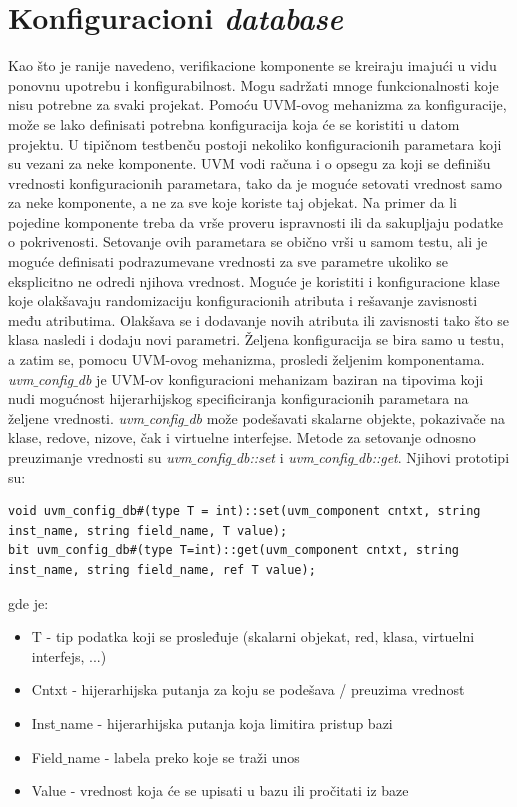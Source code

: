 \section{Konfiguracioni \emph{database}}

Kao što je ranije navedeno, verifikacione komponente se kreiraju imajući u vidu
ponovnu upotrebu i konfigurabilnost. Mogu sadržati mnoge funkcionalnosti koje
nisu potrebne za svaki projekat. Pomoću UVM-ovog mehanizma za konfiguracije,
može se lako definisati potrebna konfiguracija koja će se koristiti u datom
projektu. U tipičnom testbenču postoji nekoliko konfiguracionih parametara koji
su vezani za neke komponente. UVM vodi računa i o opsegu za koji se definišu
vrednosti konfiguracionih parametara, tako da je moguće setovati vrednost samo
za neke komponente, a ne za sve koje koriste taj objekat. Na primer da li
pojedine komponente treba da vrše proveru ispravnosti ili da sakupljaju podatke
o pokrivenosti. Setovanje ovih parametara se obično vrši u samom testu, ali je
moguće definisati podrazumevane vrednosti za sve parametre ukoliko se
eksplicitno ne odredi njihova vrednost. Moguće je koristiti i konfiguracione
klase koje olakšavaju randomizaciju konfiguracionih atributa i rešavanje
zavisnosti među atributima. Olakšava se i dodavanje novih atributa ili
zavisnosti tako što se klasa nasledi i dodaju novi parametri. Željena
konfiguracija se bira samo u testu, a zatim se, pomocu UVM-ovog mehanizma,
prosledi željenim komponentama.\\

\emph{uvm\(\_\)config\(\_\)db} je UVM-ov konfiguracioni mehanizam baziran na
tipovima koji nudi mogućnost hijerarhijskog specificiranja konfiguracionih
parametara na željene vrednosti. \emph{uvm\(\_\)config\(\_\)db} može podešavati
skalarne objekte, pokazivače na klase, redove, nizove, čak i virtuelne
interfejse. Metode za setovanje odnosno preuzimanje vrednosti su
\emph{uvm\(\_\)config\(\_\)db::set} i \emph{uvm\(\_\)config\(\_\)db::get}.
Njihovi prototipi su:

\begin{lstlisting}
void uvm_config_db#(type T = int)::set(uvm_component cntxt, string inst_name, string field_name, T value);
bit uvm_config_db#(type T=int)::get(uvm_component cntxt, string inst_name, string field_name, ref T value);
\end{lstlisting}

gde je:

\begin{itemize}
\item T - tip podatka koji se prosleđuje (skalarni objekat, red, klasa,
  virtuelni interfejs, ...)
\item Cntxt - hijerarhijska putanja za koju se podešava / preuzima vrednost
\item Inst\(\_\)name - hijerarhijska putanja koja limitira pristup bazi
\item Field\(\_\)name - labela preko koje se traži unos
\item Value - vrednost koja će se upisati u bazu ili pročitati iz baze
\end{itemize}

